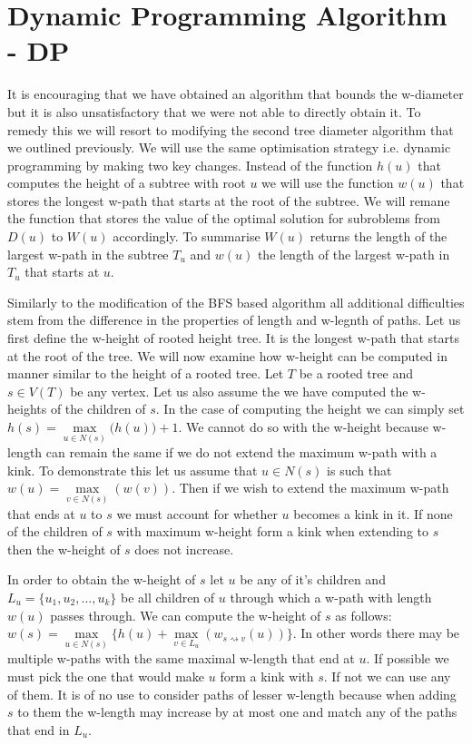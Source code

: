 \section{Dynamic Programming Algorithm - DP}


It is encouraging that we have obtained an algorithm that bounds the w-diameter but it is also unsatisfactory that we were not able to directly obtain it. To remedy this we will resort to modifying the second tree diameter algorithm that we outlined previously. We will use the same optimisation strategy i.e. dynamic programming by making two key changes. Instead of the function $h(u)$ that computes the height of a subtree with root $u$ we will use the function $w(u)$ that stores the longest w-path that starts at the root of the subtree. We will remane the function that stores the value of the optimal solution for subroblems from $D(u)$ to $W(u)$ accordingly. To summarise $W(u)$ returns the length of the largest w-path in the subtree $T_u$ and $w(u)$ the length of the largest w-path in $T_u$ that starts at $u$.

Similarly to the modification of the BFS based algorithm all additional difficulties stem from the difference in the properties of length and w-legnth of paths. Let us first define the w-height of rooted height tree. It is the longest w-path that starts at the root of the tree. We will now examine how w-height can be computed in manner similar to the height of a rooted tree. Let $T$ be a rooted tree and $s \in V(T)$ be any vertex. Let us also assume the we have computed the w-heights of the children of $s$. In the case of computing the height we can simply set $h(s) = \max\limits_{u \in N(s)}\big( h(u) \big) + 1$. We cannot do so with the w-height because w-length can remain the same if we do not extend the maximum w-path with a kink.  To demonstrate this let us assume that $u \in N(s)$ is such that $w(u) = \max\limits_{v \in N(s)}(w(v))$. Then if we wish to extend the maximum w-path that ends at $u$ to $s$ we must account for whether $u$ becomes a kink in it. If none of the children of $s$ with maximum w-height form a kink when extending to $s$ then the w-height of $s$ does not increase.

In order to obtain the w-height of $s$ let $u$ be any of it's children and $L_u = \{u_1, u_2, ..., u_k\}$ be all children of $u$ through which a w-path with length $w(u)$ passes through. We can compute the w-height of $s$ as follows: $w(s) = \max\limits_{u \in N(s)}\{ h(u) + \max\limits_{v \in L_u}(w_{s \rightsquigarrow v}(u)) \}$. In other words there may be multiple w-paths with the same maximal w-length that end at $u$. If possible we must pick the one that would make $u$ form a kink with $s$. If not we can use any of them. It is of no use to consider paths of lesser w-length because when adding $s$ to them the w-length may increase by at most one and match any of the paths that end in $L_u$.

